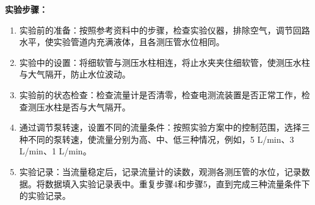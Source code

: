 \documentclass[dvipsnames, svgnames,a4paper,11pt]{article}
\begin{document}
	\textbf{实验步骤：}
	
	\begin{enumerate}
		\item 实验前的准备：按照参考资料中的步骤，检查实验仪器，排除空气，调节回路水平，使实验管道内充满液体，且各测压管水位相同。
		\item 实验中的设置：将细软管与测压水柱相连，将止水夹夹住细软管，使测压水柱与大气隔开，防止水位波动。
		\item 实验前的状态检查：检查流量计是否清零，检查电测流装置是否正常工作，检查测压水柱是否与大气隔开。
		\item 通过调节泵转速，设置不同的流量条件：按照实验方案中的控制范围，选择三种不同的泵转速，使流量分别为高、中、低三种情况，例如，5 L/min、3 L/min、1 L/min。
		\item 实验记录：当流量稳定后，记录流量计的读数，观测各测压管的水位，记录数据。将数据填入实验记录表中。重复步骤4和步骤5，直到完成三种流量条件下的实验记录。
	\end{enumerate}
	
	
\end{document}
